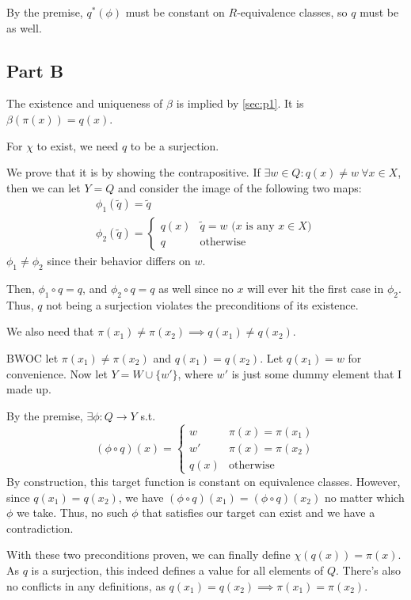 \documentclass[12pt]{article}
\begin{document}
By the premise, $q^*(\phi)$ must be constant on $R$-equivalence classes,
so $q$ must be as well.

\subsection{Part B}

The existence and uniqueness of $\beta$ is implied by \ref{sec:p1}.
It is $\beta(\pi(x))=q(x)$.

For $\chi$ to exist, we need $q$ to be a surjection.

We prove that it is by showing the contrapositive.
If $\exists w \in Q: q(x) \ne w\ \forall x \in X$, then we can let $Y=Q$
and consider the image of the following two maps:
\begin{gather*}
  \phi_1(\tilde{q})=\tilde{q} \\
  \phi_2(\tilde{q})=\begin{cases}
    q(x) & \tilde{q}=w\text{ ($x$ is any $x \in X$)} \\
    q    & \text{otherwise}
  \end{cases}
\end{gather*}
$\phi_1 \ne \phi_2$ since their behavior differs on $w$.

Then, $\phi_1 \circ q=q$, and $\phi_2 \circ q=q$ as well since no $x$
will ever hit the first case in $\phi_2$.
Thus, $q$ not being a surjection violates the preconditions of its existence.

We also need that $\pi(x_1) \ne \pi(x_2) \implies q(x_1) \ne q(x_2)$.

BWOC let $\pi(x_1) \ne \pi(x_2)$ and $q(x_1)=q(x_2)$.
Let $q(x_1)=w$ for convenience.
Now let $Y=W \cup \{w'\}$, where $w'$ is just some dummy element that I made up.

By the premise, $\exists \phi: Q \to Y$ s.t.
\[(\phi \circ q)(x)=\begin{cases}
    w    & \pi(x)=\pi(x_1)  \\
    w'   & \pi(x)=\pi(x_2)  \\
    q(x) & \text{otherwise}
  \end{cases}\]
By construction, this target function is constant on equivalence classes.
However, since $q(x_1)=q(x_2)$, we have $(\phi \circ q)(x_1)=(\phi \circ q)(x_2)$
no matter which $\phi$ we take.
Thus, no such $\phi$ that satisfies our target can exist and we have a contradiction.

With these two preconditions proven, we can finally define $\chi(q(x))=\pi(x)$.
As $q$ is a surjection, this indeed defines a value for all elements of $Q$.
There's also no conflicts in any definitions, as $q(x_1)=q(x_2) \implies \pi(x_1)=\pi(x_2)$.
\end{document}
